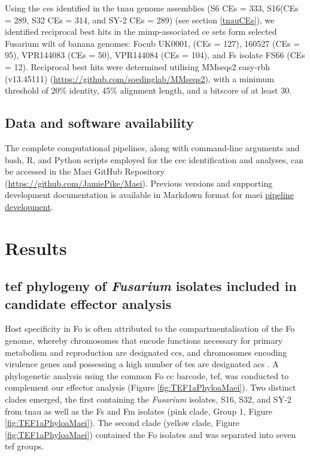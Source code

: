 Using the \acp{ce} identified in the  \ac{tnau} genome assemblies (S6 CEs = 333, S16(CEs = 289, S32 CEs = 314, and SY-2 CEs = 289) (see section \ref{tnauCEs}), we identified reciprocal best hits in the \ac{mimp}-associated \ac{ce} sets form selected \ac{Fusarium} wilt of banana genomes: \ac{Focub} UK0001, (CEs = 127), 160527 (CEs = 95), VPR144083 (CEs = 50), VPR144084 (CEs = 104), and \ac{Fs} isolate FS66 (CEs = 12).  Reciprocal best hits were determined utilising MMseqs2 easy-rbh (v13.45111) (\href{https://github.com/soedinglab/MMseqs2}{https://github.com/soedinglab/MMseqs2}),
with a minimum threshold of 20\% identity, 45\% alignment length, and a bitscore of at least 30.

\subsection{Data and software availability}

The complete computational pipelines, along with command-line arguments and bash, R, and Python scripts employed for the \ac{cec} identification and analyses, can be accessed in the Maei GitHub Repository (\href{https://github.com/JamiePike/Maei}{https://github.com/JamiePike/Maei}). Previous versions and supporting development documentation is available in Markdown format for \ac{maei} \href{https://github.com/JamiePike/Maei/tree/main/dev}{pipeline development}.

\newpage
\section{Results}

\subsection{\ac{tef} phylogeny of \textit{Fusarium} isolates included in candidate effector analysis}

Host specificity in \ac{Fo} is often attributed to the compartmentalisation of the \ac{Fo} genome, whereby chromosomes that  encode functions
necessary for primary metabolism and reproduction are designated \acfp{cc}, and chromosomes encoding virulence genes and possessing a high number of \acp{te} are designated \acfp{ac} \parencite{Ma2010, Dam2017}. A phylogenetic analysis using the common \ac{Fo} \ac{cc} barcode, \acf{tef}, was conducted to complement our effector analysis (Figure \ref{fig:TEF1aPhyloaMaei}). Two distinct clades emerged, the first containing the \textit{Fusarium} isolates, S16, S32, and SY-2 from \ac{tnau} as well as the \acl{Fs} and \acl{Fm} isolates (pink clade, Group 1, Figure \ref{fig:TEF1aPhyloaMaei}). The second clade (yellow clade, Figure \ref{fig:TEF1aPhyloaMaei}) contained the \ac{Fo} isolates and was separated into seven \ac{tef} groups.  

